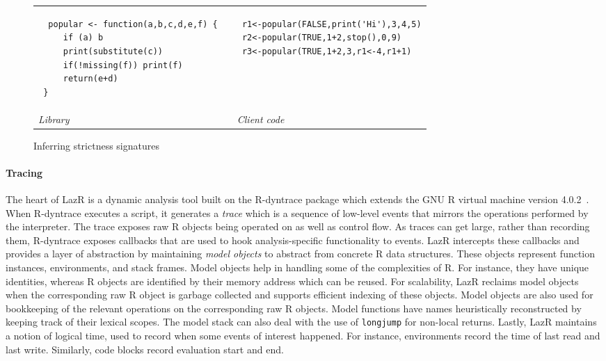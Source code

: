 \documentclass[screen,acmsmall]{acmart}
\newcommand{\rdyn}{{\sf R-dyntrace}\xspace}
\renewcommand{\c}[1]{\lstinline |#1|\xspace}
\newcommand{\lazr}{{\sf LazR}\xspace}
\begin{document}
\begin{figure}[!h]
  \begin{tabular}{lll}
    \begin{minipage}{6cm}
\begin{lstlisting}
  popular <- function(a,b,c,d,e,f) {
     if (a) b
     print(substitute(c))
     if(!missing(f)) print(f)
     return(e+d)
 }
\end{lstlisting}

    \end{minipage}
    &&
       \begin{minipage}{6cm}
\begin{lstlisting}
 r1<-popular(FALSE,print('Hi'),3,4,5)
 r2<-popular(TRUE,1+2,stop(),0,9)
 r3<-popular(TRUE,1+2,3,r1<-4,r1+1)
\end{lstlisting}
       \end{minipage}\\
    {\it Library}&&{\it Client code}
  \end{tabular}%
  \caption{Inferring strictness signatures}\label{iss} %
\end{figure}

\paragraph{Tracing}
The heart of \lazr is a dynamic analysis tool built on the \rdyn package which
extends the GNU R virtual machine version 4.0.2~\cite{oopsla19b}. When \rdyn
executes a script, it generates a \emph{trace} which is a sequence of low-level
events that mirrors the operations performed by the interpreter. The trace
exposes raw R objects being operated on as well as control flow. As traces can
get large, rather than recording them, \rdyn exposes callbacks that are used to
hook analysis-specific functionality to events. \lazr intercepts these callbacks
and provides a layer of abstraction by maintaining \emph{model objects} to
abstract from concrete R data structures. These objects represent function
instances, environments, and stack frames. Model objects help in handling some
of the complexities of R. For instance, they have unique identities, whereas R
objects are identified by their memory address which can be reused. For
scalability, \lazr reclaims model objects when the corresponding raw R object is
garbage collected and supports efficient indexing of these objects. Model
objects are also used for bookkeeping of the relevant operations on the
corresponding raw R objects. Model functions have names heuristically
reconstructed by keeping track of their lexical scopes. The model stack can also
deal with the use of \c{longjump} for non-local returns. Lastly, \lazr maintains
a notion of logical time, used to record when some events of interest happened.
For instance, environments record the time of last read and last write.
Similarly, code blocks record evaluation start and end.
\end{document}
